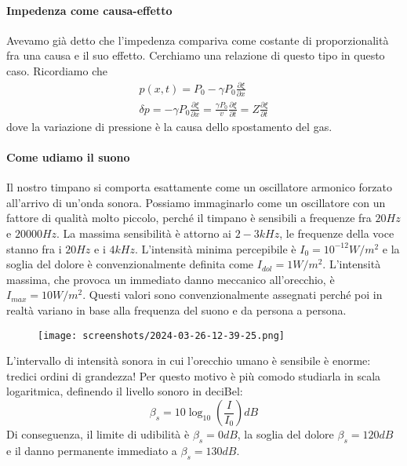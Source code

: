 \paragraph{Impedenza come causa-effetto}
Avevamo già detto che l'impedenza compariva come costante di proporzionalità fra una causa e il suo effetto. Cerchiamo una relazione di questo tipo in questo caso. Ricordiamo che
\begin{gather}
	p(x,t) = P_0 - \gamma P_0 \frac{\partial \xi }{\partial x}\\
	\delta p = - \gamma P_0 \frac{\partial \xi }{\partial x} = \frac{\gamma  P_0}{v} \frac{\partial \xi }{\partial t} = Z \frac{\partial \xi }{\partial t} 
\end{gather}
dove la variazione di pressione è la causa dello spostamento del gas.

\paragraph{Come udiamo il suono}
Il nostro timpano si comporta esattamente come un oscillatore armonico forzato all'arrivo di un'onda sonora. Possiamo immaginarlo come un oscillatore con un fattore di qualità molto piccolo, perché il timpano è sensibili a frequenze fra \(20 \unit{Hz}\) e \(20000 \unit{Hz}\). La massima sensibilità è attorno ai \(2-3 \unit{kHz}\), le frequenze della voce stanno fra i \(20 \unit{Hz}\) e i \(4 \unit{kHz}\). L'intensità minima percepibile è \(I_0 = 10^{-12} \unit{W / m^2}\) e la soglia del dolore è convenzionalmente definita come \(I_{dol} = 1 \unit{W / m^2}\). L'intensità massima, che provoca un immediato danno meccanico all'orecchio, è \(I_{max} = 10 \unit{W / m^2}\). Questi valori sono convenzionalmente assegnati perché poi in realtà variano in base alla frequenza del suono e da persona a persona.
\begin{figure}[H]
	\centering
	\texttt{[image: screenshots/2024-03-26-12-39-25.png]}
\end{figure}
L'intervallo di intensità sonora in cui l'orecchio umano è sensibile è enorme: tredici ordini di grandezza! Per questo motivo è più comodo studiarla in scala logaritmica, definendo il livello sonoro in deciBel:
\begin{equation}
	\beta _s = 10 \log_{10} \left( \frac{I}{I_0} \right) \unit{dB}
\end{equation}
Di conseguenza, il limite di udibilità è \(\beta _s = 0 \unit{dB}\), la soglia del dolore \(\beta _s = 120 \unit{dB}\) e il danno permanente immediato a \(\beta _s = 130 \unit{dB}\).

